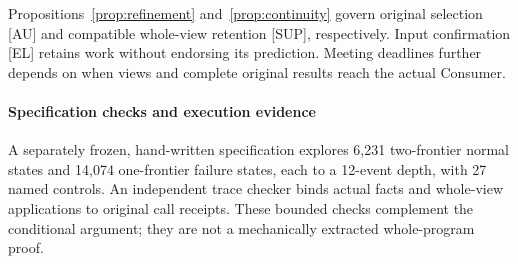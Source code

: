 Propositions~\ref{prop:refinement} and~\ref{prop:continuity} govern original
selection [AU] and compatible whole-view retention [SUP], respectively.
Input confirmation [EL] retains work without endorsing its prediction.
Meeting deadlines further depends on when views and complete original
results reach the actual Consumer.

\paragraph{Specification checks and execution evidence}
A separately frozen, hand-written specification explores 6,231 two-frontier normal
states and 14,074 one-frontier failure states, each to a 12-event depth,
with 27 named controls. An independent trace checker binds actual facts
and whole-view applications to original call receipts. These bounded
checks complement the conditional argument; they are not a mechanically
extracted whole-program proof.

